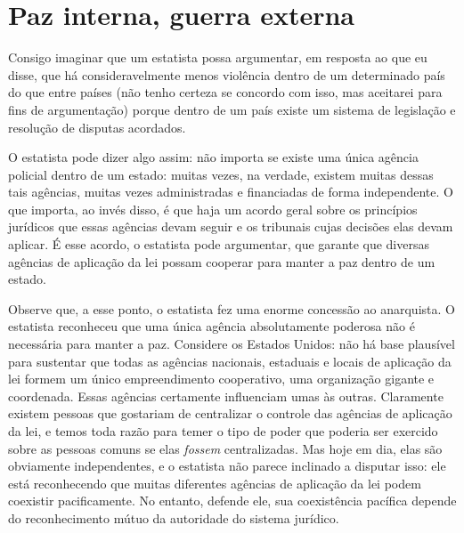 \section{Paz interna, guerra externa}

Consigo imaginar que um estatista possa argumentar, em resposta ao que eu disse, que há consideravelmente menos violência dentro de um determinado país do que entre países (não tenho certeza se concordo com isso, mas aceitarei para fins de argumentação) porque dentro de um país existe um sistema de legislação e resolução de disputas acordados.

O estatista pode dizer algo assim: não importa se existe uma única agência policial dentro de um estado: muitas vezes, na verdade, existem muitas dessas tais agências, muitas vezes administradas e financiadas de forma independente. O que importa, ao invés disso, é que haja um acordo geral sobre os princípios jurídicos que essas agências devam seguir e os tribunais cujas decisões elas devam aplicar. É esse acordo, o estatista pode argumentar, que garante que diversas agências de aplicação da lei possam cooperar para manter a paz dentro de um estado.

Observe que, a esse ponto, o estatista fez uma enorme concessão ao anarquista. O estatista reconheceu que uma única agência absolutamente poderosa não é necessária para manter a paz. Considere os Estados Unidos: não há base plausível para sustentar que todas as agências nacionais, estaduais e locais de aplicação da lei formem um único empreendimento cooperativo, uma organização gigante e coordenada. Essas agências certamente influenciam umas às outras. Claramente existem pessoas que gostariam de centralizar o controle das agências de aplicação da lei, e temos toda razão para temer o tipo de poder que poderia ser exercido sobre as pessoas comuns se elas \emph{fossem} centralizadas. Mas hoje em dia, elas são obviamente independentes, e o estatista não parece inclinado a disputar isso: ele está reconhecendo que muitas diferentes agências de aplicação da lei podem coexistir pacificamente. No entanto, defende ele, sua coexistência pacífica depende do reconhecimento mútuo da autoridade do sistema jurídico.

